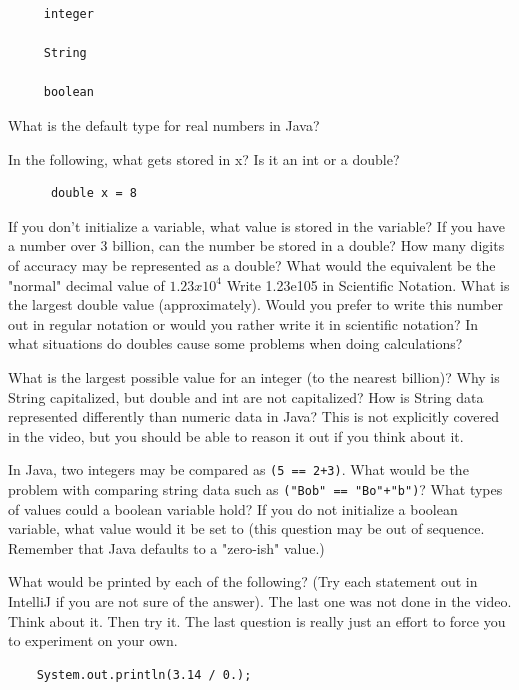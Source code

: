 \documentclass[letterpaper,11pt]{exam}
\begin{document}
\begin{questions}
\begin{samepage}
\begin{verbatim}
     integer

     String

     boolean
\end{verbatim}
\end{samepage}
\question What is the default type for real numbers in Java?
\begin{samepage}
\question In the following, what gets stored in x?  Is it an int or a double?
\begin{verbatim}
      double x = 8
\end{verbatim}
\end{samepage}
\question If you don't initialize a variable, what value is stored in the variable?
\question If you have a number over 3 billion, can the number be stored in a double?
\question How many digits of accuracy may be represented as a double?
\question What would the equivalent be the "normal" decimal value of $1.23 x 10^4$
\question Write 1.23e105 in Scientific Notation.
\question What is the largest double value (approximately).  Would you prefer to write this number out in regular notation or would you rather write it in scientific notation?
\question In what situations do doubles cause some problems when doing calculations?

\question What is the largest possible value for an integer (to the nearest billion)?
\question Why is String capitalized, but double and int are not capitalized?
\question How is String data represented differently than numeric data in Java?
\vspace{1cm}
\question This is not explicitly covered in the video, but you should be able to reason it out if you think about it.  

In Java, two integers may be compared as \texttt{(5 == 2+3)}.  What would be the problem with comparing string data such as \texttt{("Bob" == "Bo"+"b")}?
\vspace{1cm}
\question What types of values could a boolean variable hold?
\question If you do not initialize a boolean variable, what value would it be set to (this question may be out of sequence.  Remember that Java defaults to a "zero-ish" value.)
\begin{samepage}
\question What would be printed by each of the following?  (Try each statement out in IntelliJ if you are not sure of the answer).  The last one was not done in the video.  Think about it.  Then try it.  The last question is really just an effort to force you to experiment on your own.
\begin{verbatim}
    System.out.println(3.14 / 0.);


\end{verbatim}
\end{samepage}
\end{questions}
\end{document}
